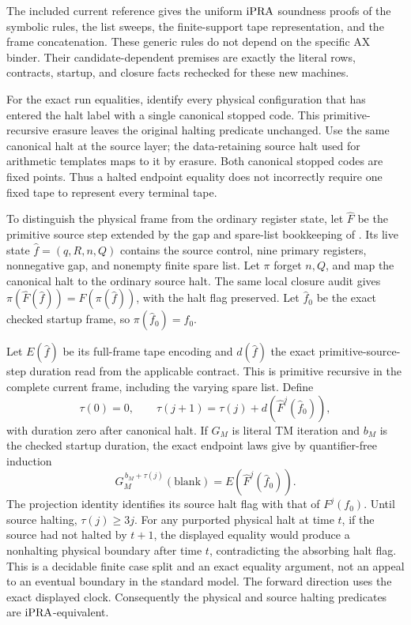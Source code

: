 The included current reference 
gives the uniform $\mathrm{iPRA}$ soundness proofs of the symbolic rules,
the list sweeps, the finite-support tape representation, and the
frame concatenation. These generic rules do not depend on the
specific AX binder. Their candidate-dependent premises are exactly
the literal rows, contracts, startup, and closure facts rechecked
for these new machines.

For the exact run equalities, identify every physical configuration that
has entered the halt label with a single canonical stopped code. This
primitive-recursive erasure leaves the original halting predicate unchanged.
Use the same canonical halt at the source layer; the data-retaining source
halt used for arithmetic templates maps to it by erasure. Both canonical
stopped codes are fixed points. Thus a halted endpoint equality does not
incorrectly require one fixed tape to represent every terminal tape.

To distinguish the physical frame from the ordinary register state, let
$\widehat F$ be the primitive source step extended by the gap and
spare-list bookkeeping of . Its live state
$\widehat f=(q,R,n,Q)$ contains the source control, nine primary registers,
nonnegative gap, and nonempty finite spare list. Let $\pi$ forget $n,Q$,
and map the canonical halt to the ordinary source halt. The same local
closure audit gives
$\pi(\widehat F(\widehat f))=F(\pi(\widehat f))$, with the halt flag
preserved. Let $\widehat f_0$ be the exact checked startup frame, so
$\pi(\widehat f_0)=f_0$.

Let $E(\widehat f)$ be its full-frame tape encoding and $d(\widehat f)$
the exact primitive-source-step duration read from the applicable
contract. This is primitive recursive in the complete current frame,
including the varying spare list. Define
\[
 \tau(0)=0,\qquad
 \tau(j+1)=\tau(j)+d(\widehat F^j(\widehat f_0)),
\]
with duration zero after canonical halt. If $G_M$ is literal TM
iteration and $b_M$ is the checked startup duration, the exact endpoint
laws give by quantifier-free induction
\[
 G_M^{\,b_M+\tau(j)}(\mathrm{blank})=E(\widehat F^j(\widehat f_0)).
\]
The projection identity identifies its source halt flag with that of
$F^j(f_0)$.
Until source halting, $\tau(j)\ge3j$.
For any purported physical halt at time $t$, if the source had not
halted by $t+1$, the displayed equality would produce a nonhalting
physical boundary after time $t$, contradicting the absorbing halt
flag. This is a decidable finite case split and an exact equality
argument, not an appeal to an eventual boundary in the standard
model. The forward direction uses the exact displayed clock.
Consequently the physical and source halting predicates are
$\mathrm{iPRA}$-equivalent.


